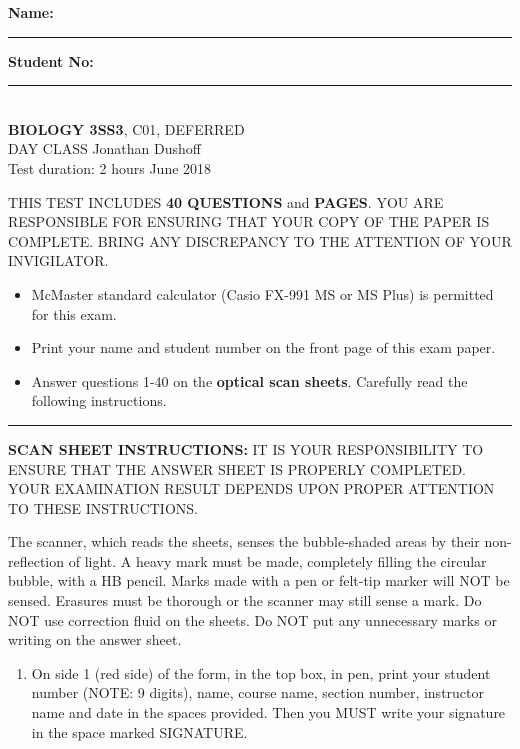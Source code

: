 

\textbf{Name:} \rule{5cm}{1pt} \hfill \textbf{Student No:} \rule{5cm}{1pt} \\

\bigskip\noindent \hfill {\large {\bf BIOLOGY 3SS3}, C01,
	DEFERRED
} \hspace*{\fill} \\
DAY CLASS  \hfill Jonathan Dushoff \\
Test duration: 2 hours \hfill June 2018

{\small

\medskip\noindent THIS TEST INCLUDES {\bf 40 QUESTIONS} and \textbf{\pageref{LastPage} PAGES}. YOU ARE RESPONSIBLE FOR ENSURING THAT YOUR COPY OF THE PAPER IS COMPLETE. BRING ANY DISCREPANCY TO THE ATTENTION OF YOUR INVIGILATOR. 

\begin{itemize}
\item McMaster standard calculator (Casio FX-991 MS or MS Plus) is permitted for this exam.
\item Print your name and student number on the front page of this exam paper.
\item Answer questions 1-40 on the \textbf{optical scan sheets}.  Carefully read the following instructions.
\end{itemize}
\hrule
\bigskip\textbf{SCAN SHEET INSTRUCTIONS:} 
IT IS YOUR RESPONSIBILITY TO ENSURE THAT THE ANSWER SHEET IS PROPERLY COMPLETED. YOUR EXAMINATION RESULT DEPENDS UPON PROPER ATTENTION TO THESE INSTRUCTIONS.

The scanner, which reads the sheets, senses the bubble-shaded areas by their non-reflection of light.  A heavy mark must be made, completely filling the circular bubble, with a HB pencil.  Marks made with a pen or felt-tip marker will NOT be sensed.  Erasures must be thorough or the scanner may still sense a mark.  Do NOT use correction fluid on the sheets.  Do NOT put any unnecessary marks or writing on the answer sheet.

\begin{enumerate}

\item On side 1 (red side) of the form, in the top box, in pen, print your student number (NOTE: 9 digits), name, course name, section number, instructor name and date in the spaces provided.  Then you MUST write your signature in the space marked SIGNATURE.


\end{enumerate}}
